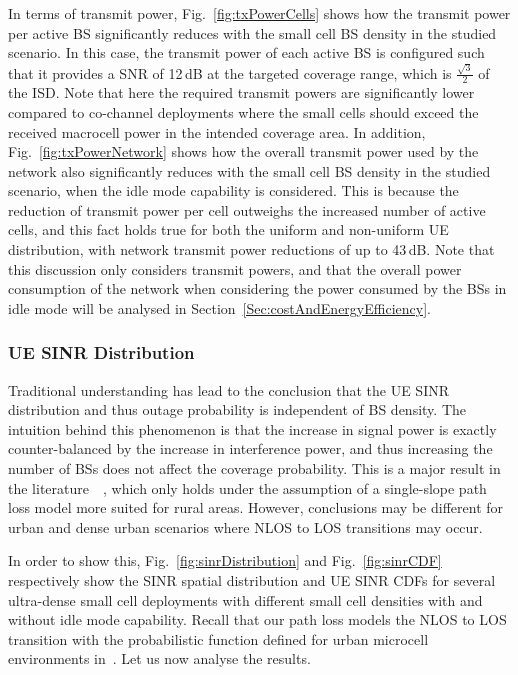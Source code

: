 \documentclass{IEEEtran}
\begin{document}
In terms of transmit power,
Fig.~\ref{fig:txPowerCells} shows how the transmit power per active \ac{BS} significantly reduces with the small cell \ac{BS} density in the studied scenario.
In this case,
the transmit power of each active \ac{BS} is configured such that it provides a \ac{SNR} of 12\,dB at the targeted coverage range,
which is $\frac{\sqrt{3}}{2}$ of the \ac{ISD}.
Note that here the required transmit powers are significantly lower compared to co-channel deployments where the small cells should exceed the received macrocell power in the intended coverage area.
In addition, Fig.~\ref{fig:txPowerNetwork} shows how the overall transmit power used by the network also significantly reduces with the small cell \ac{BS} density in the studied scenario,
when the idle mode capability is considered.
This is because the reduction of transmit power per cell outweighs the increased number of active cells,
and this fact holds true for both the uniform and non-uniform \ac{UE} distribution,
with network transmit power reductions of up to 43\,dB.
Note that this discussion only considers transmit powers,
and that the overall power consumption of the network when considering the power consumed by the \acp{BS} in idle mode
will be analysed in Section~\ref{Sec:costAndEnergyEfficiency}.

\subsubsection{\ac{UE} \ac{SINR} Distribution}

Traditional understanding has lead to the conclusion that the \ac{UE} \ac{SINR} distribution and thus outage probability is independent of \ac{BS} density.
The intuition behind this phenomenon is that the increase in signal power is exactly counter-balanced by the increase in interference power,
and thus increasing the number of BSs does not affect the coverage probability.
This is  a major result in the literature~\cite{Andrews2011}~\cite{Mukherjee2012},
which only holds under the assumption of a single-slope path loss model more suited for rural areas.
However, conclusions may be different for urban and dense urban scenarios where \ac{NLOS} to \ac{LOS} transitions may occur.

In order to show this,
Fig.~\ref{fig:sinrDistribution} and Fig.~\ref{fig:sinrCDF} respectively show the \ac{SINR} spatial distribution and \ac{UE} \ac{SINR} \acp{CDF}
for several ultra-dense small cell deployments
with different small cell densities with and without idle mode capability.
Recall  that our path loss models the \ac{NLOS} to \ac{LOS} transition with the probabilistic function defined for urban microcell environments in~\cite{TR36.814}.
Let us now analyse the results.
\end{document}
